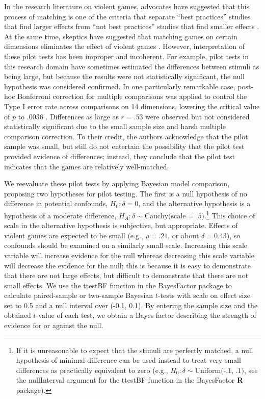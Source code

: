 \documentclass[man]{apa6}
\begin{document}
In the research literature on violent games, advocates have suggested that this process of matching is one of the criteria that separate ``best practices'' studies that find larger effects from ``not best practices'' studies that find smaller effects \citep{Anderson:etal:2010}. At the same time, skeptics have suggested that matching games on certain dimensions eliminates the effect of violent games \citep{Adachi:Willoughby:2011}. However, interpretation of these pilot tests has been improper and incoherent. For example, pilot tests in this research domain have sometimes estimated the differences between stimuli as being large, but because the results were not statistically significant, the null hypothesis was considered confirmed. In one particularly remarkable case, post-hoc Bonferroni correction for multiple comparisons was applied to control the Type I error rate across comparisons on 14 dimensions, lowering the critical value of $p$ to .0036 \citep{Arriaga:etal:2008}. Differences as large as $r = .53$ were observed but not considered statistically significant due to the small sample size and harsh multiple comparison correction. To their credit, the authors acknowledge that the pilot sample was small, but still do not entertain the possibility that the pilot test provided evidence of differences; instead, they conclude that the pilot test indicates that the games are relatively well-matched.

We reevaluate these pilot tests by applying Bayesian model comparison, proposing two hypotheses for pilot testing. The first is a null hypothesis of no difference in potential confounds, $H_0: \delta{} = 0$, and the alternative hypothesis is a hypothesis of a moderate difference, $H_A: \delta{} \sim{} \mbox{Cauchy(scale = .5)}$.\footnote{If it is unreasonable to expect that the stimuli are perfectly matched, a null hypothesis of minimal difference can be used instead to treat very small differences as practically equivalent to zero (e.g., $H_0: \delta{} \sim{} \mbox{Uniform(-.1, .1)}$, see the nullInterval argument for the ttestBF function in the BayesFactor {\bf R} package).} This choice of scale in the alternative hypothesis is subjective, but appropriate. Effects of violent games are expected to be small (e.g., $\rho = .21$, or about $\delta = 0.43$), so confounds should be examined on a similarly small scale. Increasing this scale variable will increase evidence for the null whereas decreasing this scale variable will decrease the evidence for the null; this is because it is easy to demonstrate that there are not large effects, but difficult to demonstrate that there are not small effects. %
We use the ttestBF function in the BayesFactor package \citep{Morey:Rouder:2014} to calculate paired-sample or two-sample Bayesian $t$-tests with scale on effect size set to 0.5 and a null interval over (-0.1, 0.1). %
By entering the sample size and the obtained $t$-value of each test, we obtain a Bayes factor describing the strength of evidence for or against the null.  
\end{document}
